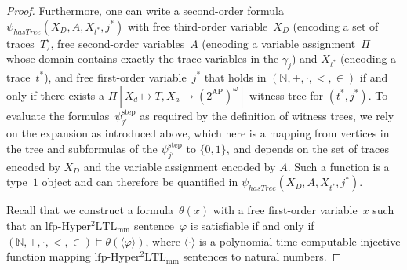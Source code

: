 \documentclass[dvipsnames,10pt,a4paper]{amsart}
\theoremstyle{definition}
\theoremstyle{remark}
\newcommand{\nats}{\mathbb{N}}
\renewcommand{\phi}{\varphi}
\newcommand{\pow}[1]{2^{#1}}
\newcommand{\set}[1]{\{#1\}}
\newcommand{\lfpsohyltlfp}{\mathrm{lfp\text{-}{Hyper^2LTL_{\mathrm{mm}}}}\xspace}
\newcommand{\ap}[0]{\mathrm{AP}}
\newcommand{\univar}{X_a}
\newcommand{\unidisvar}{X_d}
\newcommand{\natsstruct}{(\nats, +, \cdot, <, \in)}
\newcommand{\step}{\mathrm{step}}
\newcommand{\hastree}{\mathit{hasTree}}
\newcommand{\encode}[1]{\langle #1\rangle}
\begin{document}
\begin{proof}
Furthermore, one can write a second-order formula~$\psi_{\hastree}(X_D,A, X_{t^*}, j^*)$ with free third-order variable~$X_D$ (encoding a set of traces~$T$), free second-order variables~$A$ (encoding a variable assignment~$\Pi$ whose domain contains exactly the trace variables in the $\gamma_j$) and $X_{t^*}$ (encoding a trace~$t^*$), and free first-order variable~$j^*$ that holds in $\natsstruct$ if and only if there exists a $\Pi[\unidisvar\mapsto T, \univar\mapsto (\pow{\ap})^\omega]$-witness tree for $(t^*,j^*)$.
To evaluate the formulas~$\psi_{j'}^\step$ as required by the definition of witness trees, we rely on the expansion as introduced above, which here is a mapping from vertices in the tree and subformulas of the $\psi_{j'}^\step$ to $\set{0,1}$, and depends on the set of traces encoded by $X_D$ and the variable assignment encoded by $A$.
Such a function is a type~$1$ object and can therefore be quantified in $\psi_{\hastree}(X_D,A, X_{t^*}, j^*)$.

Recall that we construct a formula~$\theta(x)$ with a free first-order variable~$x$ such that an $\lfpsohyltlfp$ sentence~$\phi$ is satisfiable if and only if $\natsstruct \models \theta(\encode{\phi})$, where $\encode{\cdot}$ is a polynomial-time computable injective function mapping $\lfpsohyltlfp$ sentences to natural numbers.


\end{proof}
\end{document}
